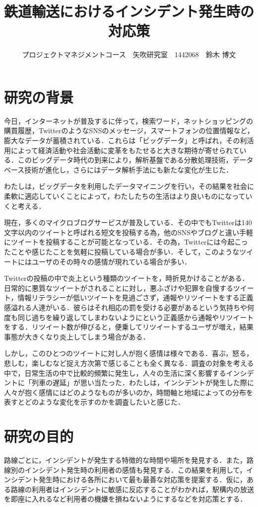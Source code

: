 \documentclass[uplatex,twocolumn,dvipdfmx]{jsarticle}
\title{\vspace{-5mm}\fontsize{14pt}{0pt}\selectfont 鉄道輸送におけるインシデント発生時の対応策}
\author{\normalsize プロジェクトマネジメントコース　矢吹研究室　1442068　鈴木 博文}
\date{}
\begin{document}
\fontsize{10.5pt}{\baselineskip}\selectfont
\maketitle

\section{研究の背景}
今日，インターネットが普及するに伴って，検索ワード，ネットショッピングの購買履歴，TwitterのようなSNSのメッセージ，スマートフォンの位置情報など，膨大なデータが蓄積されている．これらは「ビッグデータ」と呼ばれ，その利活用によって経済活動や社会活動に変革をもたせると大きな期待が寄せられている．このビッグデータ時代の到来により，解析基盤である分散処理技術，データベース技術が進化し，さらにはデータ解析手法にも新たな変化が生じた\cite{bib1}．

わたしは，ビッグデータを利用したデータマイニングを行い，その結果を社会に柔軟に適応していくことによって，わたしたちの生活はより良いものになっていくと考える．

現在，多くのマイクロブログサービスが普及している．その中でもTwitterは140文字以内のツイートと呼ばれる短文を投稿する為，他のSNSやブログと違い手軽にツイートを投稿することが可能となっている．その為，Twitterには今起こったことや感じたことを気軽に投稿している場合が多い．そして，このようなツイートにはユーザのその時々の感情が現れている場合が多い\cite{bib2}．

Twitterの投稿の中で炎上という種類のツイートを，時折見かけることがある．日常的に悪質なツイートがされることに対し，悪ふざけや犯罪を自慢するツイート，情報リテラシーが低いツイートを見過ごさず，通報やリツイートをする正義感溢れる人達がいる．彼らはそれ相応の罰を受ける必要があるという気持ちや何度も同じ過ちを繰り返してしまわないようにという正義感から通報やリツイートをする．リツイート数が伸びると，便乗してリツイートするユーザが増え，結果事態が大きくなり炎上してしまう場合がある\cite{bib3}．

しかし，このひとつのツイートに対し人が抱く感情は様々である．喜ぶ，怒る，悲しむ，楽しむなど捉え方次第で感じることも全く異なる．調査の対象を考える中で，日常生活の中で比較的頻繁に発生し，人々の生活に深く影響するインシデントに「列車の遅延」が思い当たった．わたしは，インシデントが発生した際に人々が抱く感情にはどのようなものが多いのか，時間軸と地域によっての分布を表すとどのような変化を示すのかを調査したいと感じた．


\section{研究の目的}
路線ごとに，インシデントが発生する特徴的な時間や場所を発見する．また，路線別のインシデント発生時の利用者の感情も発見する．この結果を利用して，インシデント発生時における各所において最も最善な対応策を提案する．仮に，ある路線の利用者はインシデントに敏感に反応することがわかれば，駅構内の放送を即座に入れるなど利用者の機嫌を損ねないようにするなどを対応策とする．
\end{document}
